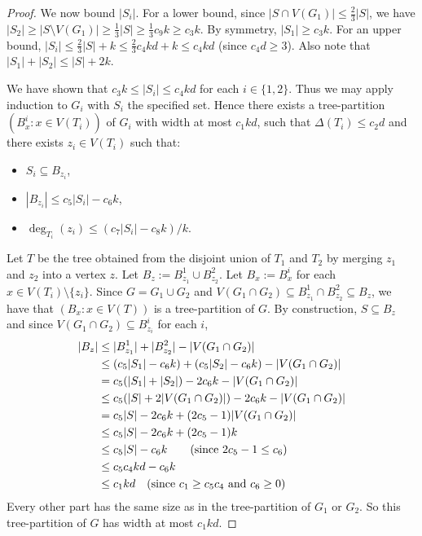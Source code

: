 \begin{proof}
We now bound $|S_i|$. For a lower bound, since $|S\cap V(G_1)|\leq \frac23 |S|$, we have $|S_2|\geq |S\setminus V(G_1)|\geq \frac13 |S| \geq \frac13 c_9k \geq c_3k $. By symmetry, $|S_1|\geq  c_3k $. For an upper bound, $|S_i|\leq\frac23 |S| + k \leq \frac23 c_4kd + k \leq c_4kd$ (since $c_4d\geq 3$). Also note that $|S_1|+|S_2|\leq |S|+2k$.

We have shown that $c_3k \leq |S_i|\leq c_4kd$ for each $i\in\{1,2\}$. Thus we may apply induction to $G_i$ with $S_i$ the specified set. Hence there exists a tree-partition $(B^i_x:x\in V(T_i))$ of $G_i$ with width at most $c_1 kd$, such that $\Delta(T_i)\leq c_2d$ and there exists $z_i\in V(T_i)$ such that:
\begin{itemize}
    \item $S_i\subseteq B_{z_i}$, 
    \item $|B_{z_i}|\leq c_5|S_i|-c_6k$,
    \item $\deg_{T_i}(z_i)\leq ( c_7 |S_i| - c_8 k)/k$.
\end{itemize}
Let $T$ be the tree obtained from the disjoint union of $T_1$ and $T_2$ by merging $z_1$ and $z_2$ into a vertex $z$. Let $B_z:= B^1_{z_1}\cup B^2_{z_2}$. Let $B_x:= B^i_x$ for each $x\in V(T_i)\setminus\{z_i\}$. Since $G=G_1\cup G_2$ and $V(G_1\cap G_2)\subseteq B^1_{z_1}\cap B^2_{z_2} \subseteq B_z$, we have that $(B_x:x\in V(T))$ is a tree-partition of $G$. 
By construction, $S\subseteq B_z$ and since $V(G_1\cap G_2)\subseteq B^i_{z_i}$ for each $i$, 
\begin{align*}
    |B_z| 
    & \leq |B^1_{z_1}|+|B^2_{z_2}| - |V(G_1\cap G_2)|\\
    & \leq (c_5|S_1|-c_6k) +  (c_5|S_2|-c_6k) - |V(G_1\cap G_2)|\\
    & = c_5( |S_1|+ |S_2|) -2c_6k - |V(G_1\cap G_2)|\\
    & \leq c_5( |S| + 2|V(G_1\cap G_2)| ) -2c_6k - |V(G_1\cap G_2)|\\
    & = c_5 |S|  -2c_6k + (2c_5-1) |V(G_1\cap G_2)|\\
    & \leq c_5 |S|  -2c_6k + (2c_5-1) k\\
    & \leq c_5|S| - c_6 k\qquad \text{(since $ 2c_5-1 \leq c_6$)}\\
    & \leq c_5 c_4 kd - c_6 k \\
    & \leq c_1 kd \quad \text{(since $c_1 \geq c_5c_4$ and $c_6\geq 0$)}
\end{align*}
Every other part has the same size as in the tree-partition of $G_1$ or $G_2$. So this tree-partition of $G$ has width at most $c_1kd$. 

\end{proof}
